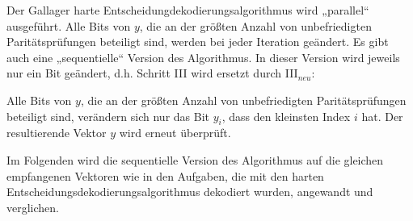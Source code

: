 \begin{Theorem}
Der Gallager harte Entscheidungdekodierungsalgorithmus wird „parallel“ ausgeführt. 
Alle Bits von $y$, die an der grö\ss{}ten Anzahl von unbefriedigten Paritätsprüfungen beteiligt sind, werden bei jeder Iteration geändert. 
Es gibt auch eine „sequentielle“ Version des Algorithmus. 
In dieser Version wird jeweils nur ein Bit geändert, d.h. Schritt III wird ersetzt durch III$_{neu}$:

Alle Bits von $y$, die an der grö\ss{}ten Anzahl von unbefriedigten Paritätsprüfungen
beteiligt sind, verändern sich nur das Bit $y_i$, dass den kleinsten Index $i$ hat. Der resultierende Vektor $y$ wird erneut überprüft.\\
\end{Theorem}

Im Folgenden wird die sequentielle Version des Algorithmus auf die gleichen empfangenen Vektoren wie 
in den Aufgaben, die mit den harten Entscheidungsdekodierungsalgorithmus dekodiert wurden,
angewandt und verglichen.



